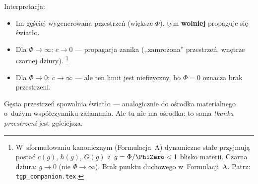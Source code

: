 Interpretacja:
\begin{itemize}[nosep]
  \item Im g\k{e}\'sciej wygenerowana przestrze\'n (wi\k{e}ksze $\Phi$),
        tym \textbf{wolniej} propaguje si\k{e} \'swiat\l{}o.
  \item Dla $\Phi \to \infty$: $c \to 0$ --- propagacja zanika
        (,,zamro\.zona'' przestrze\'n, wn\k{e}trze czarnej dziury).%
        \footnote{W~sformu\l{}owaniu kanonicznym (Formulacja~A) dynamiczne
        sta\l{}e przyjmuj\k{a} posta\'c $c(g)$, $\hbar(g)$, $G(g)$
        z~$g = \Phi/\PhiZero < 1$ blisko materii.
        Czarna dziura: $g \to 0$ (nie $\Phi \to \infty$).
        Brak punktu duchowego w~Formulacji~A.
        Patrz: \texttt{tgp\_companion.tex}.}
  \item Dla $\Phi \to 0$: $c \to \infty$ --- ale ten limit jest
        niefizyczny, bo $\Phi = 0$ oznacza brak przestrzeni.
\end{itemize}

G\k{e}sta przestrze\'n spowalnia \'swiat\l{}o --- analogicznie do
o\'srodka materialnego o~du\.zym wsp\'o\l{}czynniku za\l{}amania.
Ale tu nie ma o\'srodka: to sama \emph{tkanka przestrzeni}
jest g\k{e}\'sciejsza.

